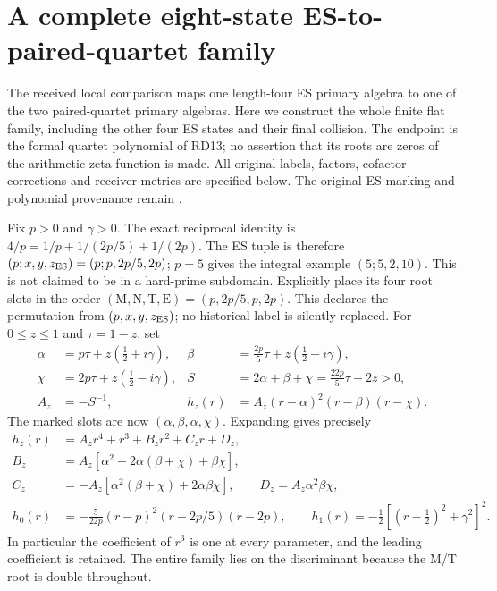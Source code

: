 \section{A complete eight-state ES-to-paired-quartet family}
The received local comparison \cite[Section 5]{ESRHReceived}
maps one length-four ES primary algebra to one of the two
paired-quartet primary algebras. Here we construct the whole
finite flat family, including the other four ES states and
their final collision. The endpoint is the formal quartet
polynomial of RD13; no assertion that its roots are zeros
of the arithmetic zeta function is made. All original
labels, factors, cofactor corrections and receiver metrics
are specified below. The original ES marking and polynomial
provenance remain \cite{ES488,Tao}.

Fix $p>0$ and $\gamma>0$. The exact reciprocal identity is
$4/p=1/p+1/(2p/5)+1/(2p)$. The ES tuple is therefore
$(p;x,y,z_{\rm ES})=(p;p,2p/5,2p)$; $p=5$ gives the
integral example $(5;5,2,10)$. This is not claimed to be
in a hard-prime subdomain. Explicitly place its four
root slots in the order
$(\mathrm M,\mathrm N,\mathrm T,\mathrm E)=(p,2p/5,p,2p)$.
This declares the permutation from $(p,x,y,z_{\rm ES})$;
no historical label is silently replaced. For $0\le z\le1$
and $\tau=1-z$, set
\begin{equation}
\begin{aligned}
 \alpha&=p\tau+z(\tfrac12+i\gamma),&
 \beta&=\tfrac{2p}{5}\tau+z(\tfrac12-i\gamma),\\
 \chi&=2p\tau+z(\tfrac12-i\gamma),&
 S&=2\alpha+\beta+\chi=\tfrac{22p}{5}\tau+2z>0,\\
 A_z&=-S^{-1},&
 h_z(r)&=A_z(r-\alpha)^2(r-\beta)(r-\chi).
\end{aligned}\tag{EF1}
\end{equation}
The marked slots are now $(\alpha,\beta,\alpha,\chi)$.
Expanding gives precisely
\begin{equation}
\begin{aligned}
 h_z(r)&=A_zr^4+r^3+B_zr^2+C_zr+D_z,\\
 B_z&=A_z[\alpha^2+2\alpha(\beta+\chi)+\beta\chi],\\
 C_z&=-A_z[\alpha^2(\beta+\chi)+2\alpha\beta\chi],\qquad
 D_z=A_z\alpha^2\beta\chi,\\
 h_0(r)&=-\frac5{22p}(r-p)^2(r-2p/5)(r-2p),\qquad
 h_1(r)=-\tfrac12[(r-\tfrac12)^2+\gamma^2]^2.
\end{aligned}\tag{EF2}
\end{equation}
In particular the coefficient of $r^3$ is one at every
parameter, and the leading coefficient is retained.
The entire family lies on the discriminant because
the M/T root is double throughout.

